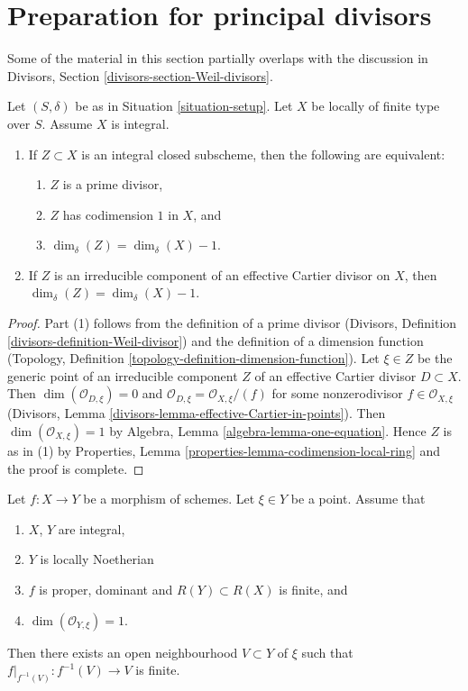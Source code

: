 \section{Preparation for principal divisors}
\label{section-preparation-principal-divisors}

\noindent
Some of the material in this section partially overlaps with the
discussion in Divisors, Section \ref{divisors-section-Weil-divisors}.

\begin{lemma}
\label{lemma-divisor-delta-dimension}
Let $(S, \delta)$ be as in Situation \ref{situation-setup}.
Let $X$ be locally of finite type over $S$. Assume $X$ is
integral.
\begin{enumerate}
\item If $Z \subset X$ is an integral closed subscheme, then
the following are equivalent:
\begin{enumerate}
\item $Z$ is a prime divisor,
\item $Z$ has codimension $1$ in $X$, and
\item $\dim_\delta(Z) = \dim_\delta(X) - 1$.
\end{enumerate}
\item If $Z$ is an irreducible component of an effective Cartier
divisor on $X$, then $\dim_\delta(Z) = \dim_\delta(X) - 1$.
\end{enumerate}
\end{lemma}

\begin{proof}
Part (1) follows from the definition of a prime divisor
(Divisors, Definition \ref{divisors-definition-Weil-divisor})
and the definition of a dimension function
(Topology, Definition \ref{topology-definition-dimension-function}).
Let $\xi \in Z$ be the generic point of an irreducible component $Z$ of
an effective Cartier divisor $D \subset X$.
Then $\dim(\mathcal{O}_{D, \xi}) = 0$ and
$\mathcal{O}_{D, \xi} = \mathcal{O}_{X, \xi}/(f)$ for some
nonzerodivisor $f \in \mathcal{O}_{X, \xi}$ (Divisors,
Lemma \ref{divisors-lemma-effective-Cartier-in-points}).
Then $\dim(\mathcal{O}_{X, \xi}) = 1$ by
Algebra, Lemma \ref{algebra-lemma-one-equation}. Hence $Z$ is as in (1) by
Properties, Lemma \ref{properties-lemma-codimension-local-ring}
and the proof is complete.
\end{proof}

\begin{lemma}
\label{lemma-finite-in-codimension-one}
Let $f : X \to Y$ be a morphism of schemes.
Let $\xi \in Y$ be a point.
Assume that
\begin{enumerate}
\item $X$, $Y$ are integral,
\item $Y$ is locally Noetherian
\item $f$ is proper, dominant and $R(Y) \subset R(X)$ is finite, and
\item $\dim(\mathcal{O}_{Y, \xi}) = 1$.
\end{enumerate}
Then there exists an open neighbourhood $V \subset Y$ of $\xi$
such that $f|_{f^{-1}(V)} : f^{-1}(V) \to V$ is finite.
\end{lemma}


